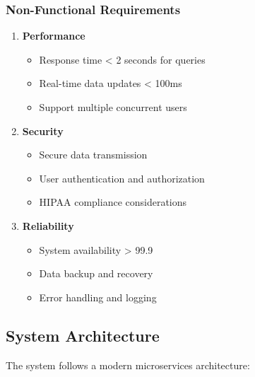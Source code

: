 \subsubsection{Non-Functional Requirements}
\begin{enumerate}
    \item \textbf{Performance}
    \begin{itemize}
        \item Response time < 2 seconds for queries
        \item Real-time data updates < 100ms
        \item Support multiple concurrent users
    \end{itemize}

    \item \textbf{Security}
    \begin{itemize}
        \item Secure data transmission
        \item User authentication and authorization
        \item HIPAA compliance considerations
    \end{itemize}

    \item \textbf{Reliability}
    \begin{itemize}
        \item System availability > 99.9%
        \item Data backup and recovery
        \item Error handling and logging
    \end{itemize}
\end{enumerate}

\subsection{System Architecture}
The system follows a modern microservices architecture:

